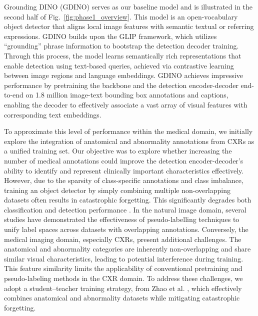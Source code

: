 \documentclass[runningheads]{llncs}
\begin{document}
Grounding DINO (GDINO) \cite{liu2024grounding} serves as our baseline model and is illustrated in the second half of Fig.~\ref{fig:phase1_overview}. This model is an open-vocabulary object detector that aligns local image features with semantic textual or referring expressions. GDINO builds upon the GLIP \cite{li2022grounded} framework, which utilizes “grounding” phrase information to bootstrap the detection decoder training. Through this process, the model learns semantically rich representations that enable detection using text-based queries, achieved via contrastive learning between image regions and language embeddings. GDINO achieves impressive performance by pretraining the backbone and the detection encoder-decoder end-to-end on 1.8 million image-text bounding box annotations and captions, enabling the decoder to effectively associate a vast array of visual features with corresponding text embeddings. 

To approximate this level of performance within the medical domain, we initially explore the integration of anatomical and abnormality annotations from CXRs as a unified training set. Our objective was to explore whether increasing the number of medical annotations could improve the detection encoder-decoder's ability to identify and represent clinically important characteristics effectively. However, due to the sparsity of class-specific annotations and class imbalance, training an object detector by simply combining multiple non-overlapping datasets often results in catastrophic forgetting. This significantly degrades both classification and detection performance \cite{zhao2020object}. In the natural image domain, several studies \cite{zhao2020object,cai2022bigdetection} have demonstrated the effectiveness of pseudo-labelling techniques to unify label spaces across datasets with overlapping annotations. Conversely, the medical imaging domain, especially CXRs, present additional challenges. The anatomical and abnormality categories are inherently non-overlapping and share similar visual characteristics, leading to potential interference during training. This feature similarity limits the applicability of conventional pretraining and pseudo-labeling methods in the CXR domain. To address these challenges, we adopt a student–teacher training strategy, from Zhao et al. \cite{zhao2020object}, which effectively combines anatomical and abnormality datasets while mitigating catastrophic forgetting.
\end{document}
